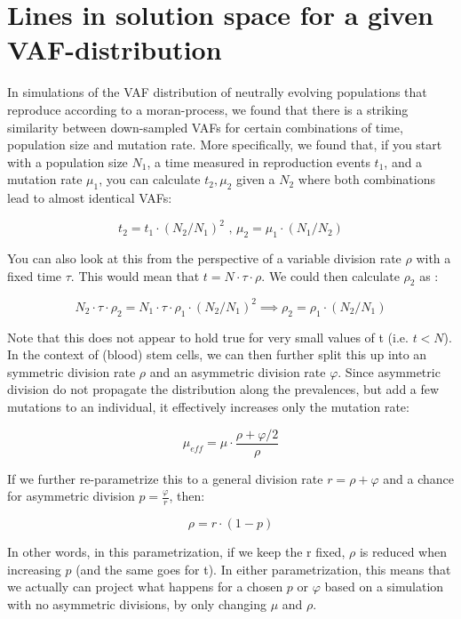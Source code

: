 \documentclass{article}
\numberwithin{equation}{subsection}
\begin{document}
	\section{Lines in solution space for a given VAF-distribution}
	
	In simulations of the VAF distribution of neutrally evolving populations that reproduce according to a moran-process, we found that there is a striking similarity between down-sampled VAFs for certain combinations of time, population size and mutation rate. More specifically, we found that, if you start with a population size $ N_1$, a time measured in reproduction events $t_1$, and a mutation rate $\mu_1 $, you can calculate $ t_2,\mu_2 $ given a $ N_2 $ where both combinations lead to almost identical VAFs:
	
	\begin{equation}
	t_2  = t_1 \cdot (N_2/N_1)^2 \text{ , } \mu_2 = \mu_1 \cdot (N_1/N_2)
	\label{eq:1}
	\end{equation}
	
	You can also look at this from the perspective of a variable division rate $ \rho $ with a fixed time $ \tau $. This would mean that $ t = N \cdot \tau \cdot \rho  $. We could then calculate $ \rho_2$ as :
	
	$$
	N_2 \cdot \tau \cdot \rho_2 = N_1 \cdot \tau \cdot \rho_1 \cdot (N_2/N_1)^2 \implies \rho_2 = \rho_1 \cdot (N_2/N_1)
	$$
	
	
	Note that this does not appear to hold true for very small values of t (i.e. $t<N$). \\
	In the context of (blood) stem cells, we can then further split this up into an symmetric division rate $ \rho $ and an asymmetric division rate $ \varphi $. Since asymmetric division do not propagate the distribution along the prevalences, but add a few mutations to an individual, it effectively increases only the mutation rate: 
	
	\begin{equation}
	\mu_{eff} = \mu \cdot \frac{\rho +\varphi/2}{\rho}
	\label{eq:2}
	\end{equation}
	
	If we further re-parametrize this to a general division rate $ r = \rho + \varphi $ and a chance for asymmetric division $ p = \frac{\varphi}{r} $, then:
	
	$$ 
	\rho = r \cdot (1-p) 
	$$ 
	
	In other words, in this parametrization, if we keep the r fixed, $\rho$ is reduced when increasing $ p $ (and the same goes for t). In either parametrization, this means that we actually can project what happens for a chosen $ p $ or $ \varphi $ based on a simulation with no asymmetric divisions, by only changing $ \mu$ and $ \rho $.\\ %
	
\end{document}
